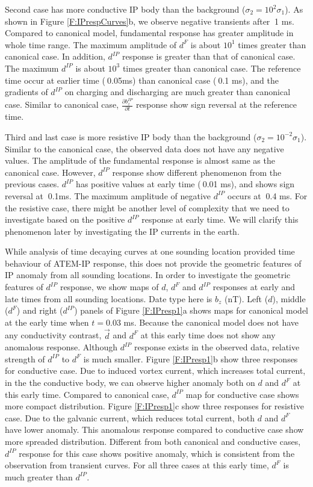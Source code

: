 \documentclass[a4paper, 11pt]{article}
\renewcommand {\d}  { {\vec d} }
\newcommand{\dip}{d^{IP}}
\begin{document}
Second case has more conductive IP body than the background ($\sigma_2 = 10^{2}\sigma_1$). As shown in Figure \ref{F:IPrespCurves}b, we observe negative transients after $~$1 ms. Compared to canonical model, fundamental response has greater amplitude in whole time range. The maximum amplitude of $d^{F}$ is about $10^{1}$ times greater than canonical case.  In addition, $\dip$ response is greater than that of canonical case. The maximum $\dip$ is about $10^{3}$ times greater than canonical case.  The reference time occur at earlier time ($~$0.05ms) than canonical case ($~$0.1 ms), and the gradients of $\dip$ on charging and discharging are much greater than canonical case. Similar to canonical case, $\frac{\partial b^{IP}_z}{\partial t}$ response show sign reversal at the reference time. 

Third and last case is more resistive IP body than the background ($\sigma_2 = 10^{-2}\sigma_1$). Similar to the canonical case, the observed data does not have any negative values. The amplitude of the fundamental response is almost same as the canonical case. However, $\dip$ response show different phenomenon from the previous cases. $\dip$ has positive values at early time ($~$0.01 ms), and shows sign reversal at $~$0.1ms. The maximum amplitude of negative $\dip$ occurs at $~$0.4 ms. For the resistive case, there might be another level of complexity that we need to investigate based on the positive $\dip$ response at early time. We will clarify this phenomenon later by investigating the IP currents in the earth. 

While analysis of time decaying curves at one sounding location provided time behaviour of ATEM-IP response, this does not provide the geometric features of IP anomaly from all sounding locations. In order to investigate the geometric features of $\dip$ response, we show maps of $d$, $d^F$ and $\dip$ responses at early and late times from all sounding locations.  Date type here is $b_z$ (nT). Left ($d$), middle ($d^F$) and right ($\dip$) panels of Figure \ref{F:IPresp1}a shows maps for canonical model at the early time when $t=$0.03 ms. Because the canonical model does not have any conductivity contrast, $\d$ and $d^F$ at this early time does not show any anomalous response. Although $\dip$ response exists in the observed data, relative strength of $\dip$ to $d^F$ is much smaller. Figure \ref{F:IPresp1}b show three responses for conductive case. Due to  induced vortex current, which increases total current, in the the conductive body, we can observe higher anomaly both on $d$ and $d^F$ at this early time. Compared to canonical case, $\dip$ map for conductive case shows more compact distribution. Figure \ref{F:IPresp1}c show three responses for resistive case. Due to the galvanic current, which reduces total current, both $d$ and $d^{F}$ have lower anomaly. This anomalous response compared to conductive case show more spreaded distribution. Different from both canonical and conductive cases, $\dip$ response for this case shows positive anomaly, which is consistent from the observation from transient curves. For all three cases at this early time, $d^F$ is much greater than $\dip$. 
\end{document}
